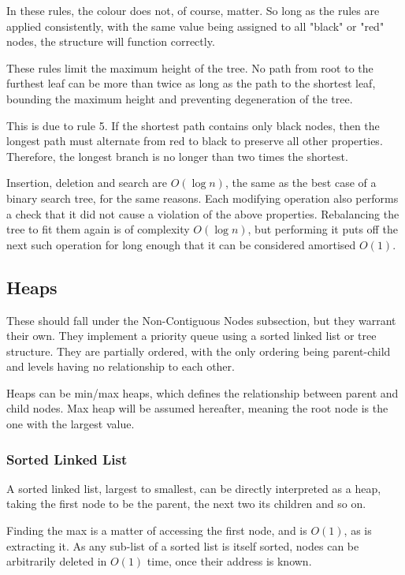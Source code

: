 \documentclass[]{article}
\begin{document}
In these rules, the colour does not, of course, matter. So long as the rules are applied consistently, with the same value being assigned to all "black" or "red" nodes, the structure will function correctly.

These rules limit the maximum height of the tree. No path from root to the furthest leaf can be more than twice as long as the path to the shortest leaf, bounding the maximum height and preventing degeneration of the tree.

This is due to rule 5. If the shortest path contains only black nodes, then the longest path must alternate from red to black to preserve all other properties. Therefore, the longest branch is no longer than two times the shortest.

Insertion, deletion and search are $O(\log{n})$, the same as the best case of a binary search tree, for the same reasons. Each modifying operation also performs a check that it did not cause a violation of the above properties. Rebalancing the tree to fit them again is of complexity $O(\log{n})$, but performing it puts off the next such operation for long enough that it can be considered amortised $O(1)$.

\pagebreak

\subsection{Heaps}

These should fall under the Non-Contiguous Nodes subsection, but they warrant their own. They implement a priority queue using a sorted linked list or tree structure. They are partially ordered, with the only ordering being parent-child and levels having no relationship to each other.

Heaps can be min/max heaps, which defines the relationship between parent and child nodes. Max heap will be assumed hereafter, meaning the root node is the one with the largest value.

\subsubsection{Sorted Linked List}

A sorted linked list, largest to smallest, can be directly interpreted as a heap, taking the first node to be the parent, the next two its children and so on.

Finding the max is a matter of accessing the first node, and is $O(1)$, as is extracting it. As any sub-list of a sorted list is itself sorted, nodes can be arbitrarily deleted in $O(1)$ time, once their address is known.
\end{document}
